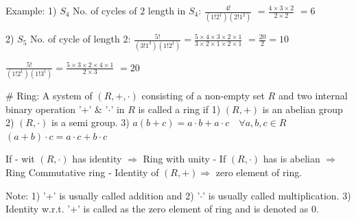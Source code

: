 Example: 1) $S_4$
No. of cycles of $2$ length in $S_4$: $\frac{4!}{(1! 2^1)(2! 1^2)}$
$= \frac{4 \times 3 \times 2}{2 \times 2}$
$= 6$

2) $S_5$
No. of cycle of length $2$: $\frac{5!}{(3! 1^3)(1! 2^1)} = \frac{5 \times 4 \times 3 \times 2 \times 1}{3 \times 2 \times 1 \times 2 \times 1}$
$= \frac{20}{2} = 10$

$\frac{5!}{(1! 2^1)(1! 3^1)} = \frac{5 \times 3 \times 2 \times 4 \times 1}{2 \times 3}$
$= 20$

# Ring: A system of $(R, +, \cdot)$ consisting of a non-empty set $R$ and two internal binary operation '+' $\&$ '$\cdot$' in $R$ is called a ring if
1) $(R, +)$ is an abelian group
2) $(R, \cdot)$ is a semi group.
3) $a(b + c) = a \cdot b + a \cdot c \quad \forall a, b, c \in R$
$(a + b) \cdot c = a \cdot c + b \cdot c$

If
- wit $(R, \cdot)$ has identity $\Rightarrow$ Ring with unity
- If $(R, \cdot)$ has is abelian $\Rightarrow$ Ring Commutative ring
- Identity of $(R, +) \Rightarrow$ zero element of ring.

Note: 1) '+' is usually called addition and
2) '$\cdot$' is usually called multiplication.
3) Identity w.r.t. '+' is called as the zero element of ring and is denoted as $0$.
